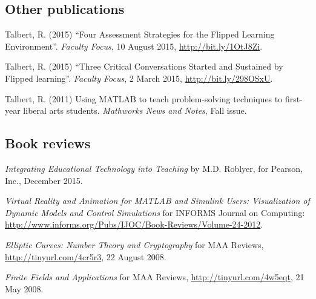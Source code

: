\documentclass[letterpaper]{article}
\renewenvironment{itemize}{
  \begin{list}{}{
    \setlength{\leftmargin}{1.5em}
	\setlength{\itemsep}{0in}
  }
}{
  \end{list}
}
\begin{document}
\subsection*{Other publications}
\begin{itemize}
	\item Talbert, R. (2015) ``Four Assessment Strategies for the Flipped Learning Environment''. \textit{Faculty Focus}, 10 August 2015, \url{http://bit.ly/1OtJ8Zi}.
	\item Talbert, R. (2015) ``Three Critical Conversations Started and Sustained by Flipped learning''. \textit{Faculty Focus}, 2 March 2015, \url{http://bit.ly/298OSxU}.
	\item Talbert, R. (2011) Using MATLAB to teach problem-solving techniques to first-year liberal arts students.\emph{ Mathworks News and Notes}, Fall issue.
\end{itemize}

\subsection*{Book reviews}
\begin{itemize}
	\item \emph{Integrating Educational Technology into Teaching} by M.D. Roblyer, for Pearson, Inc., December 2015.
	\item \emph{Virtual Reality and Animation for MATLAB and Simulink Users: Visualization of Dynamic Models and Control Simulations} for INFORMS Journal on Computing: \url{http://www.informs.org/Pubs/IJOC/Book-Reviews/Volume-24-2012}.
	\item \emph{Elliptic Curves: Number Theory and Cryptography} for MAA Reviews, \url{http://tinyurl.com/4cr5r3}, 22 August 2008.
	\item \emph{Finite Fields and Applications} for MAA Reviews, \url{http://tinyurl.com/4w5eqt}, 21 May 2008.
\end{itemize}
\end{document}
